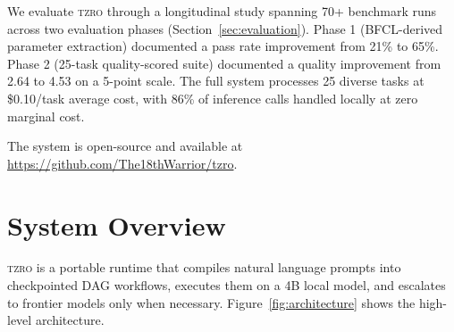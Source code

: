 \documentclass{article}
\begin{document}
We evaluate \textsc{tzro} through a longitudinal study spanning 70+ benchmark runs across two evaluation phases (Section~\ref{sec:evaluation}).
Phase 1 (BFCL-derived parameter extraction) documented a pass rate improvement from 21\% to 65\%.
Phase 2 (25-task quality-scored suite) documented a quality improvement from 2.64 to 4.53 on a 5-point scale.
The full system processes 25 diverse tasks at \$0.10/task average cost, with 86\% of inference calls handled locally at zero marginal cost.

The system is open-source and available at \url{https://github.com/The18thWarrior/tzro}.

\section{System Overview}
\label{sec:system_overview}

\textsc{tzro} is a portable runtime that compiles natural language prompts into checkpointed DAG workflows, executes them on a 4B local model, and escalates to frontier models only when necessary.
Figure~\ref{fig:architecture} shows the high-level architecture.
\end{document}
